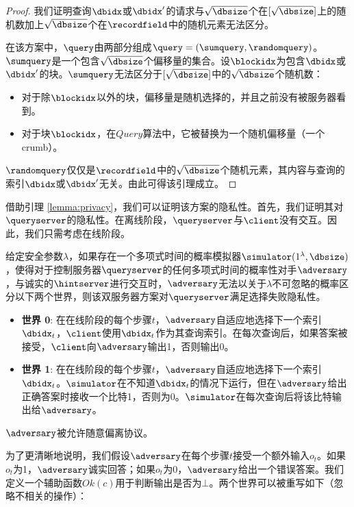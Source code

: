 \begin{proof}
我们证明查询$\dbidx$或$\dbidx'$的请求与$\sqrt{\dbsize}$个在$[\sqrt{\dbsize}]$上的随机数加上$\sqrt{\dbsize}$个在$\recordfield$中的随机元素无法区分。

在该方案中，$\query$由两部分组成$\query = (\sumquery, \randomquery)$。$\sumquery$是一个包含$\sqrt{\dbsize}$个偏移量的集合。设$\blockidx$为包含$\dbidx$或$\dbidx'$的块。$\sumquery$无法区分于$[\sqrt{\dbsize}]$中的$\sqrt{\dbsize}$个随机数：
\begin{itemize}
    \item 对于除$\blockidx$以外的块，偏移量是随机选择的，并且之前没有被服务器看到。
    \item 对于块$\blockidx$，在$Query$算法中，它被替换为一个随机偏移量（一个crumb）。
\end{itemize}
$\randomquery$仅仅是$\recordfield$中的$\sqrt{\dbsize}$个随机元素，其内容与查询的索引$\dbidx$或$\dbidx'$无关。由此可得该引理成立。
\end{proof}

借助引理 \ref{lemma:privacy}，我们可以证明该方案的隐私性。首先，我们证明其对$\queryserver$的隐私性。在离线阶段，$\queryserver$与$\client$没有交互。因此，我们只需考虑在线阶段。

\begin{definition}
给定安全参数$\lambda$，如果存在一个多项式时间的概率模拟器$\simulator(1^\lambda, \dbsize)$，使得对于控制服务器$\queryserver$的任何多项式时间的概率性对手$\adversary$，与诚实的$\hintserver$进行交互时，$\adversary$无法以关于$\lambda$不可忽略的概率区分以下两个世界，则该双服务器方案对$\queryserver$满足选择失败隐私性。

\begin{itemize}
    \item \textbf{世界 0}: 在在线阶段的每个步骤$t$，$\adversary$自适应地选择下一个索引$\dbidx_t$，$\client$使用$\dbidx_t$作为其查询索引。在每次查询后，如果答案被接受，$\client$向$\adversary$输出1，否则输出0。
    \item \textbf{世界 1}: 在在线阶段的每个步骤$t$，$\adversary$自适应地选择下一个索引$\dbidx_t$。$\simulator$在不知道$\dbidx_t$的情况下运行，但在$\adversary$给出正确答案时接收一个比特1，否则为0。$\simulator$在每次查询后将该比特输出给$\adversary$。
\end{itemize}$\adversary$被允许随意偏离协议。
\end{definition}

为了更清晰地说明，我们假设$\adversary$在每个步骤$t$接受一个额外输入$o_t$。如果$o_t$为1，$\adversary$诚实回答；如果$o_t$为0，$\adversary$给出一个错误答案。我们定义一个辅助函数$Ok(c)$用于判断输出是否为$\bot$。两个世界可以被重写如下（忽略不相关的操作）：

